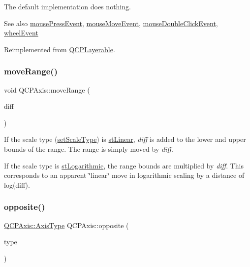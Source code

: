 The default implementation does nothing.

\begin{DoxySeeAlso}{See also}
\hyperlink{classQCPAxis_a61bc07cda6193a3fa6b5aa198fc4e4fa}{mouse\+Press\+Event}, \hyperlink{classQCPAxis_ac5a269609e6177737faabdc46434d8c7}{mouse\+Move\+Event}, \hyperlink{classQCPLayerable_a4171e2e823aca242dd0279f00ed2de81}{mouse\+Double\+Click\+Event}, \hyperlink{classQCPAxis_aa850f195d7cc470c53809d0fff5e444d}{wheel\+Event} 
\end{DoxySeeAlso}


Reimplemented from \hyperlink{classQCPLayerable_aa0d79b005686f668622bbe66ac03ba2c}{Q\+C\+P\+Layerable}.

\mbox{\label{classQCPAxis_a18f3a68f2b691af1fd34b6593c886630}} 
\subsubsection{\texorpdfstring{move\+Range()}{moveRange()}}
{\footnotesize\ttfamily void Q\+C\+P\+Axis\+::move\+Range (\begin{DoxyParamCaption}\item[{double}]{diff }\end{DoxyParamCaption})}

If the scale type (\hyperlink{classQCPAxis_adef29cae617af4f519f6c40d1a866ca6}{set\+Scale\+Type}) is \hyperlink{classQCPAxis_a36d8e8658dbaa179bf2aeb973db2d6f0aff6e30a11a828bc850caffab0ff994f6}{st\+Linear}, {\itshape diff} is added to the lower and upper bounds of the range. The range is simply moved by {\itshape diff}.

If the scale type is \hyperlink{classQCPAxis_a36d8e8658dbaa179bf2aeb973db2d6f0abf5b785ad976618816dc6f79b73216d4}{st\+Logarithmic}, the range bounds are multiplied by {\itshape diff}. This corresponds to an apparent \char`\"{}linear\char`\"{} move in logarithmic scaling by a distance of log(diff). \mbox{\label{classQCPAxis_aa85ba73dfee6483e23825461b725e363}} 
\subsubsection{\texorpdfstring{opposite()}{opposite()}}
{\footnotesize\ttfamily \hyperlink{classQCPAxis_ae2bcc1728b382f10f064612b368bc18a}{Q\+C\+P\+Axis\+::\+Axis\+Type} Q\+C\+P\+Axis\+::opposite (\begin{DoxyParamCaption}\item[{\hyperlink{classQCPAxis_ae2bcc1728b382f10f064612b368bc18a}{Q\+C\+P\+Axis\+::\+Axis\+Type}}]{type }\end{DoxyParamCaption})\hspace{0.3cm}{\ttfamily [static]}}

